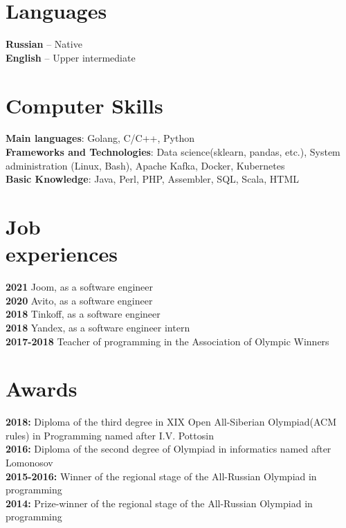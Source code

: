 \documentclass[margin,line,a4paper]{resume}
\begin{document}
\begin{resume}
\section{\mysidestyle Languages}
    \textbf{Russian} – Native \\
    \textbf{English} – Upper intermediate \\

\section{\mysidestyle Computer Skills}
    \textbf{Main languages}: Golang, C/C++, Python\\
    \textbf{Frameworks and Technologies}: Data science(sklearn, pandas, etc.),  System administration (Linux, Bash), Apache Kafka, Docker, Kubernetes\\
    \textbf{Basic Knowledge}: Java, Perl, PHP, Assembler, SQL, Scala, HTML\\
    
\section{\mysidestyle Job \\ experiences}
    \textbf{2021} Joom, as a software engineer \\
    \textbf{2020} Avito, as a software engineer \\
    \textbf{2018} Tinkoff, as a software engineer \\
    \textbf{2018} Yandex, as a software engineer intern\\
    \textbf{2017-2018} Teacher of programming in the  Association of Olympic Winners\\


\section{\mysidestyle Awards}
    \textbf{2018:} Diploma of the third degree in XIX Open All-Siberian Olympiad(ACM rules) in Programming named after I.V. Pottosin\\
    \textbf{2016:} Diploma of the second degree of Olympiad in informatics named after Lomonosov\\
    \textbf{2015-2016:} Winner of the regional stage of the All-Russian Olympiad in programming\\
    \textbf{2014:} Prize-winner of the regional stage of the All-Russian Olympiad in programming\\
\end{resume}
\end{document}
